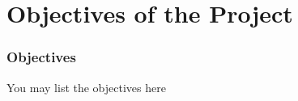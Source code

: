 \section{Objectives of the Project}
\begin{frame}
	
\frametitle{Objectives}

You may list the objectives here\\~\\


\end{frame}

